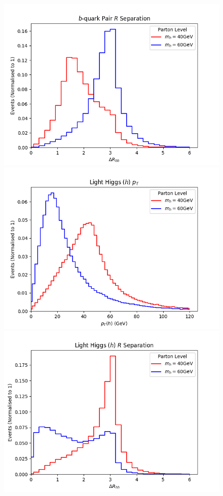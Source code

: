 \documentclass[12pt]{article}
\begin{document}
\begin{figure}[htb!]
	\begin{center}
	\includegraphics[scale=0.42]{plots/parton/delRbb.png}\\
	\includegraphics[scale=0.42]{plots/parton/LHiggs_pt.png}
	\includegraphics[scale=0.42]{plots/parton/LHiggs_DelR.png}

\end{center}
\end{figure}
\end{document}
